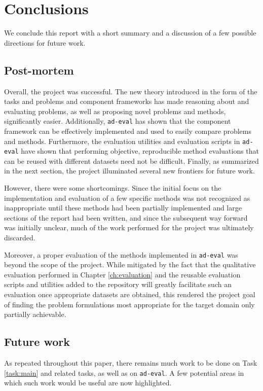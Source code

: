 \chapter{Conclusions}
\label{ch:conclusions}

We conclude this report with a short summary and a discussion of a few possible directions for future work.

\section{Post-mortem}

Overall, the project was successful. The new theory introduced in the form of the tasks and problems and component frameworks has made reasoning about and evaluating problems, as well as proposing novel problems and methods, significantly easier. Additionally, \texttt{ad-eval} has shown that the component framework can be effectively implemented and used to easily compare problems and methods. Furthermore, the evaluation utilities and evaluation scripts in \texttt{ad-eval} have shown that performing objective, reproducible method evaluations that can be reused with different datasets need not be difficult. Finally, as summarized in the next section, the project illuminated several new frontiers for future work.

However, there were some shortcomings. Since the initial focus on the implementation and evaluation of a few specific methods was not recognized as inappropriate until these methods had been partially implemented and large sections of the report had been written, and since the subsequent way forward was initially unclear, much of the work performed for the project was ultimately discarded.

Moreover, a proper evaluation of the methods implemented in \texttt{ad-eval} was beyond the scope of the project. While mitigated by the fact that the qualitative evaluation performed in Chapter \ref{ch:evaluation} and the reusable evaluation scripts and utilities added to the repository will greatly facilitate such an evaluation once appropriate datasets are obtained, this rendered the project goal of finding the problem formulations most appropriate for the target domain only partially achievable.

\section{Future work}

As repeated throughout this paper, there remains much work to be done on Task \ref{task:main} and related tasks, as well as on \texttt{ad-eval}. A few potential areas in which such work would be useful are now highlighted.

